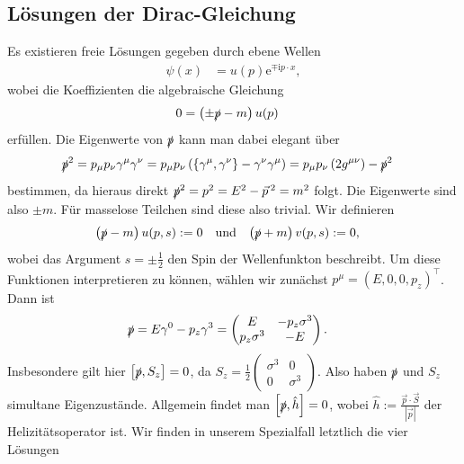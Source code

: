 \documentclass[english, parskip=full]{scrreport}
\newcommand{\kla}{}
\newcommand{\klam}{}
\newcommand{\klammer}{}
\newcommand{\tecxt}{}
\renewcommand{\i}{\text{i}}
\newcommand{\e}{\text{e}}
\begin{document}
\subsection{Lösungen der Dirac-Gleichung}
Es existieren freie Lösungen gegeben durch ebene Wellen
\begin{align}
\psi(x) &= u(p) \e^{\mp\i p\cdot x},
\end{align}
wobei die Koeffizienten die algebraische Gleichung
\begin{align}
0 &= \kla\left( \pm\slashed{p} - m \right)u(p)
\end{align}
erfüllen. 
Die Eigenwerte von $\slashed{p}$ kann man dabei elegant über
\begin{align}
\slashed{p}^2 &= p_\mu p_\nu \gamma^\mu\gamma^\nu = p_\mu p_\nu\kla\left( \klammer\left\{ \gamma^\mu, \gamma^\nu \right\} - \gamma^\nu\gamma^\mu  \right) = p_\mu p_\nu \kla\left( 2g^{\mu\nu} \right) - \slashed{p}^2
\end{align}
bestimmen, da hieraus direkt $\slashed{p}^2 = p^2 = E^2 - \vec{p}\,^2 = m^2$ folgt.
Die Eigenwerte sind also $\pm m$.
Für masselose Teilchen sind diese also trivial.
Wir definieren
\begin{align}
\kla\left( \slashed{p} - m \right)u(p,s) &:= 0 &&\tecxt\text{und}  & \kla\left( \slashed{p} + m \right)v(p,s) &:= 0,
\end{align}
wobei das Argument $s=\pm\frac{1}{2}$ den Spin der Wellenfunkton beschreibt.
Um diese Funktionen interpretieren zu können, wählen wir zunächst $p^\mu = (E, 0, 0 ,p_z)^\top$.
Dann ist
\begin{align}
\slashed{p} &= E\gamma^0 - p_z\gamma^3 = \begin{pmatrix}
E & -p_z\sigma^3 \\ p_z\sigma^3 & -E
\end{pmatrix}.
\end{align}
Insbesondere gilt hier $\klam\left[ \slashed{p}, S_z \right] = 0$, da $S_z = \frac{1}{2}\begin{pmatrix}
\sigma^3 & 0 \\ 0 & \sigma^3
\end{pmatrix}$.
Also haben $\slashed{p}$ und $S_z$ simultane Eigenzustände.
Allgemein findet man $\klam\left[ \slashed{p}, \hat{h} \right] = 0$, wobei $\hat{h} := \frac{\vec{p}\cdot\vec{S}}{|\vec{p}|}$ der Helizitätsoperator ist.
Wir finden in unserem Spezialfall letztlich die vier Lösungen
\end{document}
